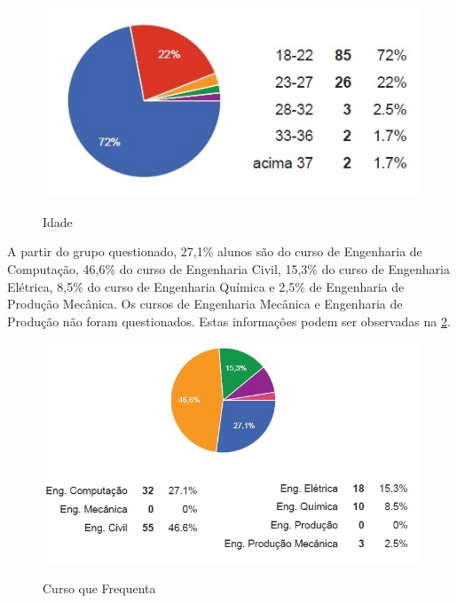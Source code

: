 \documentclass[
	article,			%
	11pt,				%
	oneside,			%
	a4paper,			%
	english,			%
	brazil,				%
	sumario=tradicional
	]{abntex2}
\begin{document}
\begin{figure}[h]  
	\begin{center} 
		\begin{center}
			\changecaptionwidth 
			\captionwidth{13.5cm} %
			\caption{\label{idade} Idade}
			{\includegraphics[scale=0.8]{imagens/idade}}
		\end{center}
	\end{center}
\end{figure}
\FloatBarrier


A partir do grupo questionado, 27,1\% alunos são do curso de Engenharia de Computação, 46,6\% do curso de Engenharia Civil, 15,3\% do curso de Engenharia Elétrica, 8,5\% do curso de Engenharia Química e 2,5\% de Engenharia de Produção Mecânica. Os cursos de Engenharia Mecânica e Engenharia de Produção não foram questionados. Estas informações podem ser observadas na \figurename{ \ref{curso}}.

\begin{figure}[h]  
	\begin{center} 
		\begin{center}
			\changecaptionwidth 
			\captionwidth{13.5cm} %
			\caption{\label{curso} Curso que Frequenta}
			{\includegraphics[scale=0.8]{imagens/curso}}
		\end{center}
	\end{center}
\end{figure}
\FloatBarrier
\end{document}
